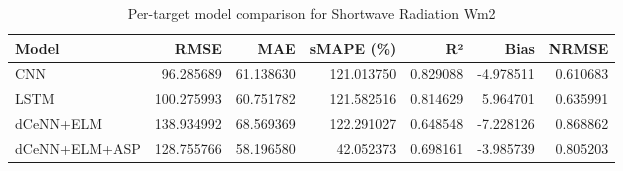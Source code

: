 \begin{table}
\caption{Per-target model comparison for Shortwave Radiation Wm2}
\begin{tabular}{lrrrrrr}
\toprule
Model & RMSE & MAE & sMAPE (\%) & R² & Bias & NRMSE \\
\midrule
CNN & 96.285689 & 61.138630 & 121.013750 & 0.829088 & -4.978511 & 0.610683 \\
LSTM & 100.275993 & 60.751782 & 121.582516 & 0.814629 & 5.964701 & 0.635991 \\
dCeNN+ELM & 138.934992 & 68.569369 & 122.291027 & 0.648548 & -7.228126 & 0.868862 \\
dCeNN+ELM+ASP & 128.755766 & 58.196580 & 42.052373 & 0.698161 & -3.985739 & 0.805203 \\
\bottomrule
\end{tabular}
\end{table}
